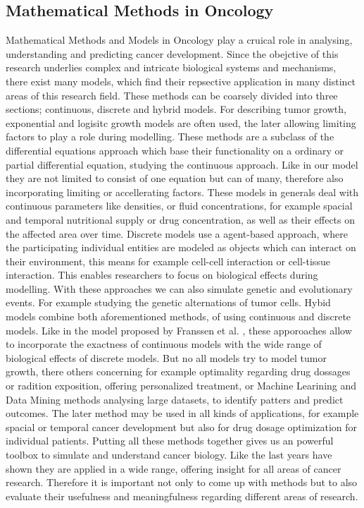 \subsection{Mathematical Methods in Oncology}
Mathematical Methods and Models in Oncology play a cruical role in analysing, understanding and predicting cancer development. Since the obejctive of this research underlies complex and intricate biological systems and mechanisms, there exist many models, which find their repsective application in many distinct areas of this research field. These methods can be coarsely divided into three sections; continuous, discrete and hybrid models. For describing tumor growth, exponential and logisitc growth models are often used, the later allowing limiting factors to play a role during modelling. These methods are a subclass of the differential equations approach which base their functionality on a ordinary or partial differential equation, studying the continuous approach. Like in our model they are not limited to consist of one equation but can of many, therefore also incorporating limiting or accellerating factors. These models in generals deal with continuous parameters like densities, or fluid concentrations, for example spacial and temporal nutritional supply or drug concentration, as well as their effects on the affected area over time. Discrete models use a agent-based approach, where the participating individual entities are modeled as objects which can interact on their environment, this means for example cell-cell interaction or cell-tissue interaction. This enables researchers to focus on biological effects during modelling. With these approaches we can also simulate genetic and evolutionary events. For example studying the genetic alternations of tumor cells.\newline 
Hybid models combine both aforementioned methods, of using continuous and discrete models. Like in the model proposed by Franssen et al. \cite{franssen_mathematical_2019}, these apporoaches allow to incorporate the exactness of continuous models with the wide range of biological effects of discrete models. \newline
But no all models try to model tumor growth, there others concerning for example optimality regarding drug dossages or radition exposition, offering personalized treatment, or Machine Learining and Data Mining methods analysing large datasets, to identify patters and predict outcomes. The later method may be used in all kinds of applications, for example spacial or temporal cancer development but also for drug dosage optimization for individual patients. Putting all these methods together gives us an powerful toolbox to simulate and understand cancer biology. Like the last years have shown they are applied in a wide range, offering insight for all areas of cancer research. Therefore it is important not only to come up with methods but to also evaluate their usefulness and meaningfulness regarding different areas of research.